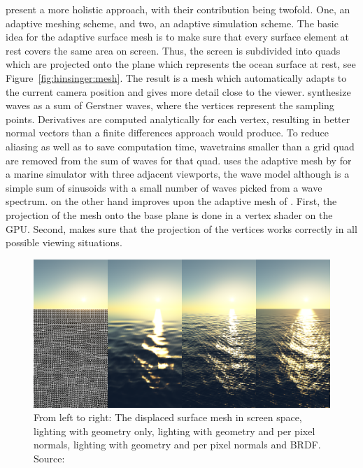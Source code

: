 \cite{Hinsinger:2002} present a more holistic approach, with their contribution
being twofold. One, an adaptive meshing scheme, and two, an adaptive simulation
scheme. The basic idea for the adaptive surface mesh is to make sure that every
surface element at rest covers the same area on screen. Thus, the screen is
subdivided into quads which are projected onto the plane which represents the
ocean surface at rest, see Figure~\ref{fig:hinsinger:mesh}. The result is
a mesh which automatically adapts to the current camera position and gives more
detail close to the viewer.
\citeauthor{Hinsinger:2002} synthesize waves as a sum of Gerstner waves, where
the vertices represent the sampling points. Derivatives are computed analytically
for each vertex, resulting in better normal vectors than a finite differences
approach would produce. To reduce aliasing as well as to save computation time,
wavetrains smaller than a grid quad are removed from the sum of waves for that quad.
\cite{Cui:2004} uses the adaptive mesh by \citeauthor{Hinsinger:2002} for a marine
simulator with three adjacent viewports, the wave model although is a simple sum
of sinusoids with a small number of waves picked from a wave spectrum.
\cite{thesis:johanson} on the other hand improves upon the adaptive mesh of
\citeauthor{Hinsinger:2002}. First, the projection of the mesh onto the base plane
is done in a vertex shader on the GPU. Second, \citeauthor{thesis:johanson} makes
sure that the projection of the vertices works correctly in all possible viewing
situations.
%
%
\begin{figure}
 \centering
 \includegraphics[scale=0.3]{figures/Seamless_Ocean_Lighting_-_Bruneton_2010-001.png}
 \caption{From left to right: The displaced surface mesh in screen space, lighting
 with geometry only, lighting with geometry and per pixel normals, lighting with 
 geometry and per pixel normals and BRDF.
 Source:~\cite{article:oceanlighting}}
\label{fig:bruneton:transitions}
\end{figure}
